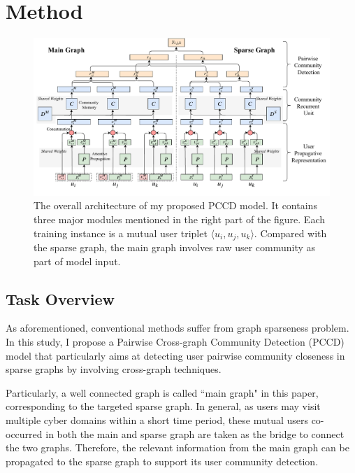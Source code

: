 \section{Method}
\begin{figure}  
	\centering
	\includegraphics[width=1\columnwidth]{img/chapter4/pipeline.pdf}
	\caption{The overall architecture of my proposed PCCD model. It contains three major modules mentioned in the right part of the figure. Each training instance is a mutual user triplet $\langle u_i,u_j,u_k \rangle$. Compared with the sparse graph, the main graph involves raw user community as part of model input.}
	
	\label{fig:c4_pipeline}
\end{figure}
\subsection{Task Overview} \label{sc:to}


As aforementioned, conventional methods suffer from graph sparseness problem. In this study, I propose a Pairwise Cross-graph Community Detection (PCCD) model that particularly aims at detecting user pairwise community closeness in sparse graphs by involving cross-graph techniques. 

Particularly, a well connected graph is called ``main graph" in this paper, corresponding to the targeted sparse graph. In general, as users may visit multiple cyber domains within a short time period, these mutual users co-occurred in both the main and sparse graph are taken as the bridge to connect the two graphs. Therefore, the relevant information from the main graph can be propagated to the sparse graph to support its user community detection. 

